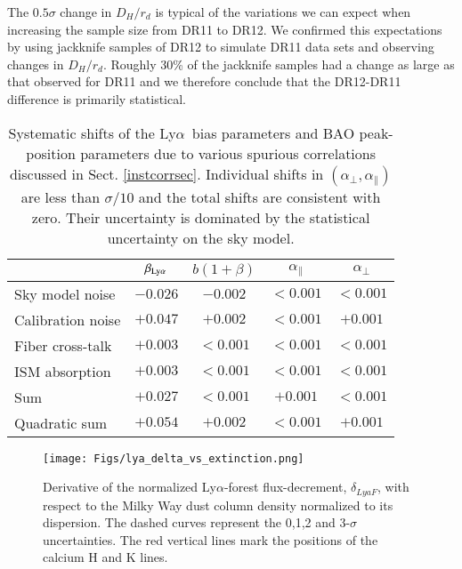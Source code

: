 \documentclass{aa}
\newcommand{\apar}{\alpha_\parallel}
\newcommand{\aperp}{\alpha_\perp}
\newcommand{\lya}{Ly$\alpha$}
\newcommand{\Lya}{Ly$\alpha$~}
\newcommand{\DHub}{D_H}
\newcommand{\betalya}{\beta_{\rm Ly\alpha}}
\newcommand{\blya}{b_{\rm Ly\alpha}}
\begin{document}
The $0.5\sigma$ change in  $\DHub/r_d$
is typical of the variations we can expect when increasing the sample
size from DR11 to DR12.  We confirmed this expectations
by using jackknife samples
of DR12 to simulate DR11 data sets and observing changes in $\DHub/r_d$.
Roughly 30\%
of the jackknife samples had a change
as large as that observed for DR11 and we therefore conclude that the DR12-DR11
difference is primarily statistical.



\begin{table}
\begin{center}
  \caption{Systematic shifts of the \Lya bias parameters
    and BAO peak-position parameters due to various spurious
  correlations discussed in Sect. \ref{instcorrsec}.
Individual shifts in $(\aperp,\apar)$  are less than $\sigma/10$ and
  the total shifts are  consistent with zero.
  Their uncertainty is dominated by the statistical uncertainty on the sky
  model.}
  \begin{tabular}{l|cccc}
  & $\betalya$ & $ b(1+\beta) $ & $\apar$ & $\aperp$\\
\hline
Sky model noise & $-0.026$ & $-0.002$ & $<0.001$ & $<0.001$ \\
Calibration noise & $+0.047$ & $+0.002$ & $<0.001$ & $+0.001$ \\
Fiber cross-talk & $+0.003$ & $<0.001$ & $<0.001$ & $<0.001$ \\
ISM absorption & $+0.003$ & $<0.001$ & $<0.001$ & $<0.001$ \\
\hline
Sum & $+0.027$ & $<0.001$ & $+0.001$ & $<0.001$ \\
\hline
Quadratic sum & $+0.054$ & $+0.002$ & $<0.001$ & $+0.001$ \\
\end{tabular}
    \label{table:pipeline_systematics}
\end{center}
\end{table}


\begin{figure}
\centering
\texttt{[image: Figs/lya\_delta\_vs\_extinction.png]}
\caption{Derivative of  the normalized \lya-forest flux-decrement,
  $\delta_{LyaF}$, with respect to the
  Milky Way dust column density normalized to its
  dispersion. 
The dashed curves represent the 0,1,2 and 3-$\sigma$ uncertainties.
The red vertical lines mark the positions of the calcium H and K lines.
\label{fig:lya_delta_vs_extinction}}
\end{figure}
\end{document}
